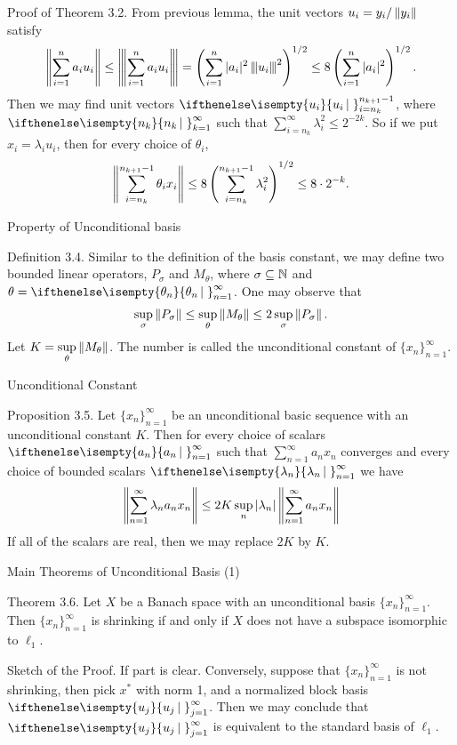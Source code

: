 \documentclass{beamer}
\newcommand{\xn}{\{x_n\}_{n=1}^\infty}
\newcommand{\xnsum}{\sum_{n=1}^\infty a_n x_n}
\begin{document}
\begin{frame}{Proof of Theorem 3.2. }
    From previous lemma, the unit vectors $u_i=y_i/\left\lVert y_i \right\rVert$ satisfy \begin{align*}
    \left\lVert \sum_{i=1}^n a_iu_i \right\rVert\leq\left\lvert\kern-0.25ex\left\lvert\kern-0.25ex\left\lvert \sum_{i=1}^n a_iu_i \right\rvert\kern-0.25ex\right\rvert\kern-0.25ex\right\rvert=\left(\sum_{i=1}^n |a_i|^2\left\lvert\kern-0.25ex\left\lvert\kern-0.25ex\left\lvert u_i \right\rvert\kern-0.25ex\right\rvert\kern-0.25ex\right\rvert^2\right)^{1/2}\leq 8\left(\sum_{i=1}^n |a_i|^2\right)^{1/2}.
\end{align*}
Then we may find unit vectors $\set{u_i}_{i=n_k}^{n_{k+1}-1}$, where $\set{n_k}_{k=1}^\infty$ such that $\sum\limits_{i=n_k}^\infty \lambda_i^2\leq 2^{-2k}$. So if we put $x_i=\lambda_iu_i$, then for every choice of $\theta_i$, \begin{align*}
        \left\lVert \sum_{i=n_k}^{n_{k+1}-1}\theta_ix_i \right\rVert\leq 8\left(\sum_{i=n_k}^{n_{k+1}-1}\lambda_i^2\right)^{1/2}\leq8\cdot 2^{-k}.
    \end{align*} 
\end{frame}
\begin{frame}{Property of Unconditional basis}
    \begin{block}{Definition 3.4.}
        Similar to the definition of the basis constant, we may define two bounded linear operators, $P_\sigma$ and $M_\theta$, where $\sigma\subseteq\mathbb N$ and $\theta=\set{\theta_n}_{n=1}^\infty$. One may observe that \begin{align*}
    \sup_\sigma\left\lVert P_\sigma \right\rVert\leq\sup_\theta\left\lVert M_\theta \right\rVert\leq2\sup_\sigma\left\lVert P_\sigma \right\rVert.
\end{align*}
Let $K=\sup\limits_{\theta}\left\lVert M_\theta \right\rVert$. The number is called the unconditional constant of $\xn$.
    \end{block}
    
\end{frame}
\begin{frame}{Unconditional Constant}
    \begin{block}{Proposition 3.5.}
    Let $\xn$ be an unconditional basic sequence with an unconditional constant $K$. Then for every choice of scalars $\set{a_n}_{n=1}^\infty$ such that $\xnsum$ converges and every choice of bounded scalars $\set{\lambda_n}_{n=1}^\infty$ we have \begin{align*}
        \norm{\sum_{n=1}^\infty \lambda_na_nx_n}\leq 2K\sup_n |\lambda_n|\norm{\xnsum}
    \end{align*}
    If all of the scalars are real, then we may replace $2K$ by $K$. 
    \end{block}
\end{frame}
\begin{frame}{Main Theorems of Unconditional Basis (1)}
    \begin{block}{Theorem 3.6.}
        Let $X$ be a Banach space with an unconditional basis $\xn$. Then $\xn$ is shrinking if and only if $X$ does not have a subspace isomorphic to $\ell_1$.
    \end{block}
    Sketch of the Proof. If part is clear. Conversely, suppose that $\xn$ is not shrinking, then pick $x^*$ with norm 1, and a normalized block basis  $\set{u_j}_{j=1}^\infty$. Then we may conclude that  $\set{u_j}_{j=1}^\infty$ is equivalent to the standard basis of $\ell_1$. 
\end{frame}
\end{document}
